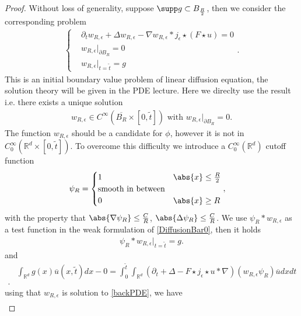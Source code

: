 \begin{proof}
Without loss of generality, suppose $\supp g \subset  B_{\frac{R}{2}}$, then we consider the corresponding problem 
\begin{align}\label{backPDE}
  \begin{cases}
    &\partial_t w_{R,\epsilon} + \Delta w_{R,\epsilon} -\nabla w_{R,\epsilon} * j_{\epsilon} \star  (F \star  u) = 0\\
    &w_{R,\epsilon} \rvert_{\partial B_{R}} =  0\\
    &w_{R,\epsilon} \rvert_{t = \tilde{t} }  = g
  \end{cases}
.\end{align}
This is an initial boundary value problem of linear diffusion equation, the solution theory will be given in the PDE lecture. Here we direclty use the result i.e.
there exists a unique solution 
\begin{align*}
  w_{R,\epsilon} \in  C^{\infty}(\overline{B_R} \times  [0,\tilde{t} ] ) \text{ with } w_{R,\epsilon} \rvert_{\partial B_R} = 0
.\end{align*}
The function $w_{R,\epsilon}$ should be a candidate  for $\phi $, however it is not in $C_0^{\infty}(\mathbb{R}^{d} \times  [0,\tilde{t} ] ) $. 
To overcome this difficulty we introduce a $C_0^{\infty}(\mathbb{R}^{d} )$ cutoff function  
\begin{align*}
    \psi_{R} &=  \begin{cases}
      1 &\abs{x} \le \frac{R}{2}\\
      \text{smooth in between} & \\
      0 &\abs{x} \ge R
    \end{cases}   
,\end{align*}
with the property that $ \abs{\nabla \psi_R} \le \frac{C}{R} $, $\abs{\Delta  \psi_R} \le \frac{C}{R}$.
We use $\psi_R * w_{R,\epsilon}$ as a test function in the weak formulation of \autoref{DiffusionBar0}, then it holds
\begin{align*}
  \psi_{R}*w_{R,\epsilon} \rvert_{t = \tilde{t} } = g
.\end{align*}
and 
\begin{align*}
  &\int_{\mathbb{R}^{d} } g(x)\overline{u}(x,\tilde{t} )dx - 0 = \int_0^{\tilde{t} } \int_{\mathbb{R}^{d} }  (\partial_t  + \Delta -  F \star  j_{\epsilon} \star u * \nabla)(w_{R,\epsilon} \psi_R) \overline{u}dxdt\\
.\end{align*}
using that $w_{R,\epsilon}$ is solution to \autoref{backPDE}, we have
\begin{align*}

\end{align*}
\end{proof}
